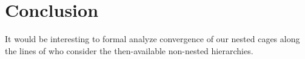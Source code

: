 
\section{Conclusion}
\label{sec:conclusion}

It would be interesting to formal analyze convergence of our nested cages along
the lines of \cite{chan1996convergence} who consider the then-available non-nested hierarchies.


